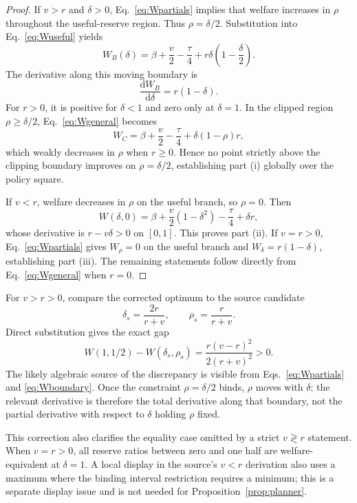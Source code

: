 \begin{proof}
If $v>r$ and $\delta>0$, Eq.~\eqref{eq:Wpartials} implies that welfare increases in $\rho$ throughout the useful-reserve region. Thus $\rho=\delta/2$. Substitution into Eq.~\eqref{eq:Wuseful} yields
\begin{equation}\label{eq:Wboundary}
W_B(\delta)=\beta+\frac v2-\frac{\tau}{4}+r\delta\left(1-\frac\delta2\right).
\end{equation}
The derivative along this moving boundary is
\[
\frac{\mathrm d W_B}{\mathrm d\delta}=r(1-\delta).
\]
For $r>0$, it is positive for $\delta<1$ and zero only at $\delta=1$. In the clipped region $\rho\ge\delta/2$, Eq.~\eqref{eq:Wgeneral} becomes
\[
W_C=\beta+\frac v2-\frac{\tau}{4}+\delta(1-\rho)r,
\]
which weakly decreases in $\rho$ when $r\ge0$. Hence no point strictly above the clipping boundary improves on $\rho=\delta/2$, establishing part (i) globally over the policy square.

If $v<r$, welfare decreases in $\rho$ on the useful branch, so $\rho=0$. Then
\[
W(\delta,0)=\beta+\frac v2(1-\delta^2)-\frac{\tau}{4}+\delta r,
\]
whose derivative is $r-v\delta>0$ on $[0,1]$. This proves part (ii). If $v=r>0$, Eq.~\eqref{eq:Wpartials} gives $W_\rho=0$ on the useful branch and $W_\delta=r(1-\delta)$, establishing part (iii). The remaining statements follow directly from Eq.~\eqref{eq:Wgeneral} when $r=0$.
\end{proof}

For $v>r>0$, compare the corrected optimum to the source candidate
\[
\delta_s=\frac{2r}{r+v},\qquad \rho_s=\frac{r}{r+v}.
\]
Direct substitution gives the exact gap
\begin{equation}\label{eq:Wgap}
W(1,1/2)-W(\delta_s,\rho_s)
=\frac{r(v-r)^2}{2(r+v)^2}>0.
\end{equation}
The likely algebraic source of the discrepancy is visible from Eqs.~\eqref{eq:Wpartials} and \eqref{eq:Wboundary}. Once the constraint $\rho=\delta/2$ binds, $\rho$ moves with $\delta$; the relevant derivative is therefore the total derivative along that boundary, not the partial derivative with respect to $\delta$ holding $\rho$ fixed.

This correction also clarifies the equality case omitted by a strict $v\gtrless r$ statement. When $v=r>0$, all reserve ratios between zero and one half are welfare-equivalent at $\delta=1$. A local display in the source's $v<r$ derivation also uses a maximum where the binding interval restriction requires a minimum; this is a separate display issue and is not needed for Proposition~\ref{prop:planner}.
